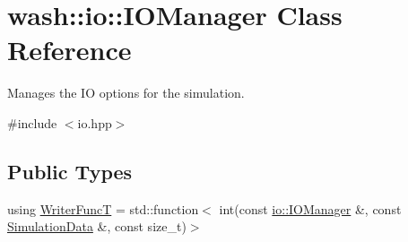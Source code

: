 \hypertarget{classwash_1_1io_1_1IOManager}{}\section{wash\+:\+:io\+:\+:I\+O\+Manager Class Reference}
\label{classwash_1_1io_1_1IOManager}


Manages the IO options for the simulation.  




{\ttfamily \#include $<$io.\+hpp$>$}

\subsection*{Public Types}
\begin{DoxyCompactItemize}
\item 
using \mbox{\hyperlink{classwash_1_1io_1_1IOManager_aeda8c39a8e3c748efd1b3e0f8ae823ee}{Writer\+FuncT}} = std\+::function$<$ int(const \mbox{\hyperlink{classwash_1_1io_1_1IOManager}{io\+::\+I\+O\+Manager}} \&, const \mbox{\hyperlink{structwash_1_1io_1_1SimulationData}{Simulation\+Data}} \&, const size\+\_\+t)$>$
\end{DoxyCompactItemize}
